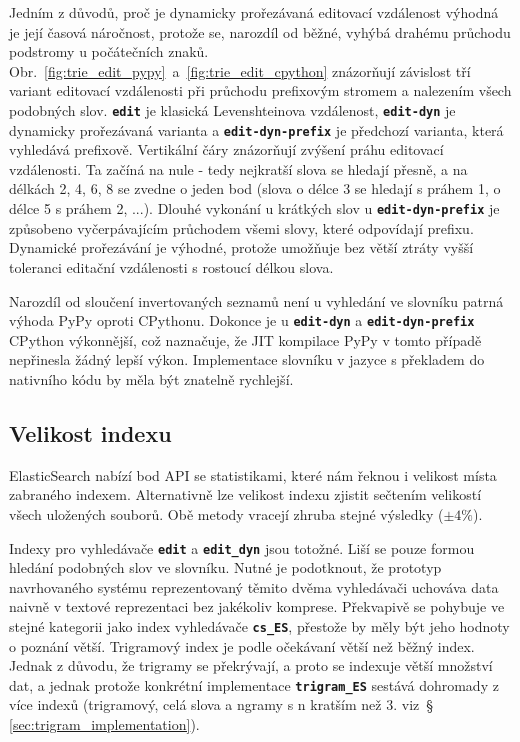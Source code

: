 \documentclass[11pt,letterpaper,oneside,openright]{book}
\newcommand{\bftt}[1]{\texttt{\textbf{#1}}}
\begin{document}
Jedním z důvodů, proč je dynamicky prořezávaná editovací vzdálenost výhodná je
její časová náročnost, protože se, narozdíl od běžné, vyhýbá drahému průchodu
podstromy u počátečních znaků.
Obr.~\ref{fig:trie_edit_pypy}~a~\ref{fig:trie_edit_cpython} znázorňují
závislost tří variant editovací vzdálenosti při průchodu prefixovým stromem a
nalezením všech podobných slov. \bftt{edit} je klasická Levenshteinova
vzdálenost, \bftt{edit-dyn} je dynamicky prořezávaná varianta a
\bftt{edit-dyn-prefix} je předchozí varianta, která vyhledává prefixově.
Vertikální čáry znázorňují zvýšení práhu editovací vzdálenosti. Ta začíná na
nule - tedy nejkratší slova se hledají přesně, a na délkách 2, 4, 6, 8 se
zvedne o jeden bod (slova o délce 3 se hledají s práhem 1, o délce 5 s práhem
2, ...). Dlouhé vykonání u krátkých slov u \bftt{edit-dyn-prefix} je způsobeno
vyčerpávajícím průchodem všemi slovy, které odpovídají prefixu. Dynamické
prořezávání je výhodné, protože umožňuje bez větší ztráty vyšší toleranci
editační vzdálenosti s rostoucí délkou slova.

Narozdíl od sloučení invertovaných seznamů není u vyhledání ve slovníku patrná
výhoda PyPy oproti CPythonu. Dokonce je u \bftt{edit-dyn} a
\bftt{edit-dyn-prefix} CPython výkonnější, což naznačuje, že JIT kompilace PyPy
v tomto případě nepřinesla žádný lepší výkon. Implementace slovníku v jazyce s
překladem do nativního kódu by měla být znatelně rychlejší.



\subsection{Velikost indexu}
ElasticSearch nabízí bod API se statistikami, které nám řeknou i velikost místa
zabraného indexem. Alternativně lze velikost indexu zjistit sečtením velikostí
všech uložených souborů. Obě metody vracejí zhruba stejné výsledky ($\pm 4\%$).

Indexy pro vyhledávače \bftt{edit} a \bftt{edit\_dyn} jsou totožné. Liší se
pouze formou hledání podobných slov ve slovníku. Nutné je podotknout, že
prototyp navrhovaného systému reprezentovaný těmito dvěma vyhledávači uchováva
data naivně v textové reprezentaci bez jakékoliv komprese. Překvapivě se
pohybuje ve stejné kategorii jako index vyhledávače \bftt{cs\_ES}, přestože by
měly být jeho hodnoty o poznání větší. Trigramový index je podle očekávaní
větší než běžný index. Jednak z důvodu, že trigramy se překrývají, a proto se
indexuje větší množství dat, a jednak protože konkrétní implementace
\bftt{trigram\_ES} sestává dohromady z více indexů (trigramový, celá slova a
ngramy s n kratším než 3. viz~\S\,\ref{sec:trigram_implementation}).
\end{document}
